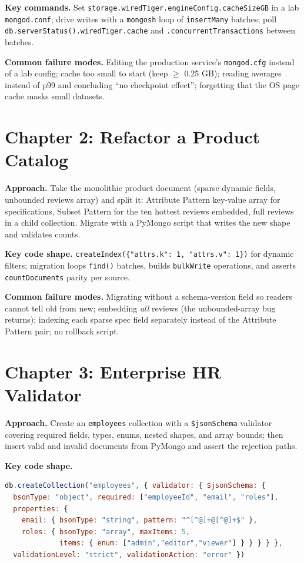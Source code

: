 \textbf{Key commands.} Set \texttt{storage.wiredTiger.engineConfig.cacheSizeGB} in a lab
\texttt{mongod.conf}; drive writes with a \texttt{mongosh} loop of
\texttt{insertMany} batches; poll \texttt{db.serverStatus().wiredTiger.cache} and
\texttt{.concurrentTransactions} between batches.

\textbf{Common failure modes.} Editing the production service's \texttt{mongod.cfg} instead of a
lab config; cache too small to start (keep $\geq$ 0.25 GB); reading averages instead of p99 and
concluding ``no checkpoint effect''; forgetting that the OS page cache masks small datasets.

\section{Chapter 2: Refactor a Product Catalog}
\textbf{Approach.} Take the monolithic product document (sparse dynamic fields, unbounded
reviews array) and split it: Attribute Pattern key-value array for specifications, Subset Pattern
for the ten hottest reviews embedded, full reviews in a child collection. Migrate with a PyMongo
script that writes the new shape and validates counts.

\textbf{Key code shape.} \texttt{createIndex(\{"attrs.k": 1, "attrs.v": 1\})} for dynamic filters;
migration loops \texttt{find()} batches, builds \texttt{bulkWrite} operations, and asserts
\texttt{countDocuments} parity per source.

\textbf{Common failure modes.} Migrating without a schema-version field so readers cannot tell
old from new; embedding \emph{all} reviews (the unbounded-array bug returns); indexing each
sparse spec field separately instead of the Attribute Pattern pair; no rollback script.

\section{Chapter 3: Enterprise HR Validator}
\textbf{Approach.} Create an \texttt{employees} collection with a \texttt{\$jsonSchema}
validator covering required fields, types, enums, nested shapes, and array bounds; then insert
valid and invalid documents from PyMongo and assert the rejection paths.

\textbf{Key code shape.}
\begin{lstlisting}[language=JavaScript, caption={Validator skeleton with strict rejection.}]
db.createCollection("employees", { validator: { $jsonSchema: {
  bsonType: "object", required: ["employeeId", "email", "roles"],
  properties: {
    email: { bsonType: "string", pattern: "^[^@]+@[^@]+$" },
    roles: { bsonType: "array", maxItems: 5,
             items: { enum: ["admin","editor","viewer"] } } } } },
  validationLevel: "strict", validationAction: "error" })
\end{lstlisting}

